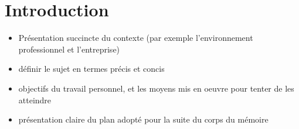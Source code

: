 
\chapter*{Introduction}

\begin{itemize}
    \item Présentation succincte du contexte (par exemple l’environnement professionnel et l’entreprise)
    \item définir le sujet en termes précis et concis
    \item objectifs du travail personnel, et les moyens mis en oeuvre pour tenter de les atteindre
    \item présentation claire du plan adopté pour la suite du corps du mémoire
\end{itemize}
